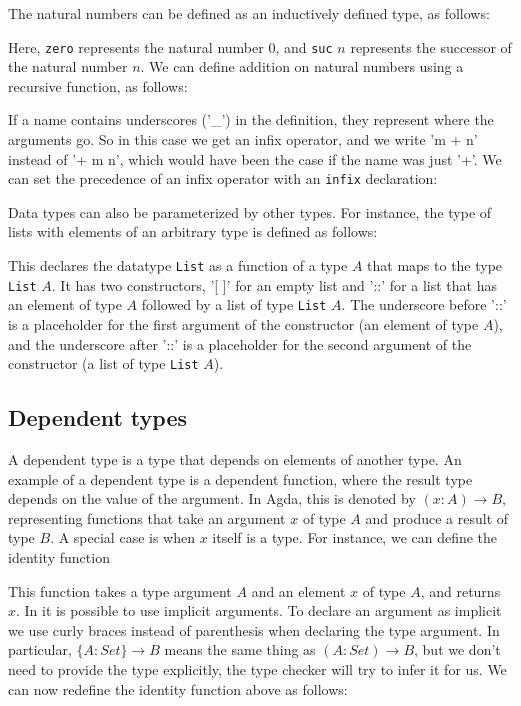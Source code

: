 \documentclass[titlepage]{article}
\begin{document}
The natural numbers can be defined as an inductively defined type, as follows:

Here, \texttt{zero} represents the natural number $0$, and \texttt{suc} $n$ represents the successor of the natural number $n$. We can define addition on natural numbers using a recursive function, as follows:


If a name contains underscores ('\_') in the definition, they represent where the arguments go. So in this case we get an infix operator, and we write 'm + n' instead of '+ m n', which would have been the case if the name was just '+'. We can set the precedence of an infix operator with an \texttt{infix} declaration:


Data types can also be parameterized by other types. For instance, the type of lists with elements of an arbitrary type is defined as follows:

This declares the datatype \texttt{List} as a function of a type $A$ that maps to the type \texttt{List} $A$. It has two constructors, '[ ]' for an empty list and '::' for a list that has an element of type $A$ followed by a list of type \texttt{List} $A$. The underscore before '::' is a placeholder for the first argument of the constructor (an element of type $A$), and the underscore after '::' is a placeholder for the second argument of the constructor (a list of type \texttt{List} $A$).


\subsection{Dependent types}

A dependent type is a type that depends on elements of another type. An example of a dependent type is a dependent function, where the result type depends on the value of the argument.  In Agda, this is denoted by $(x : A) \to B$, representing functions that take an argument $x$ of type $A$ and produce a result of type $B$. A special case is when $x$ itself is a type. For instance, we can define the identity function

This function takes a type argument $A$ and an element $x$ of type $A$, and returns $x$. In \Agda it is possible to use implicit arguments. To declare an argument as implicit we use curly braces instead of parenthesis when declaring the type argument. In particular, $\{A : Set\} \to B$ means the same thing as $(A : Set) \to B$, but we don't need to provide the type explicitly, the type checker will try to infer it for us. We can now redefine the identity function above as follows:
\end{document}
